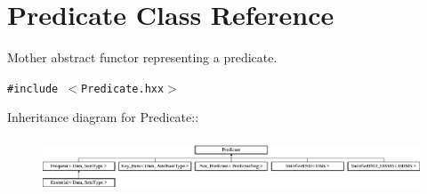 \section{Predicate Class Reference}
\label{class_predicate}
Mother abstract functor representing a predicate.  


{\tt \#include $<$Predicate.hxx$>$}

Inheritance diagram for Predicate::\begin{figure}[H]
\begin{center}
\leavevmode
\includegraphics[height=1.6cm]{class_predicate}
\end{center}
\end{figure}
